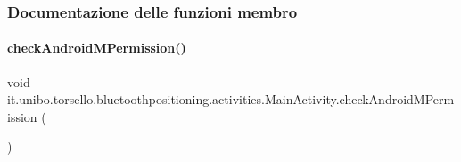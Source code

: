 \subsubsection{Documentazione delle funzioni membro}
\hypertarget{classit_1_1unibo_1_1torsello_1_1bluetoothpositioning_1_1activities_1_1MainActivity_ab762aac3d11f5b0ccc6042a140804d5d_ab762aac3d11f5b0ccc6042a140804d5d}{}\label{classit_1_1unibo_1_1torsello_1_1bluetoothpositioning_1_1activities_1_1MainActivity_ab762aac3d11f5b0ccc6042a140804d5d_ab762aac3d11f5b0ccc6042a140804d5d} 
\paragraph{\texorpdfstring{check\+Android\+M\+Permission()}{checkAndroidMPermission()}}
{\footnotesize\ttfamily void it.\+unibo.\+torsello.\+bluetoothpositioning.\+activities.\+Main\+Activity.\+check\+Android\+M\+Permission (\begin{DoxyParamCaption}{ }\end{DoxyParamCaption})\hspace{0.3cm}{\ttfamily [private]}}


